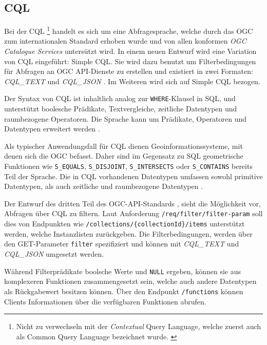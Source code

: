 \subsection{\acl{CQL}}

Bei der \acf{CQL} \footnote{Nicht zu verwechseln mit der \textit{Contextual} Query Language, welche zuerst auch als Common Query Language bezeichnet wurde. \parencite{thelibraryofcongressCQLContextual2023, ZINGGentle2003}} handelt es sich um eine Abfragesprache, welche durch das \ac{OGC} zum internationalen Standard erhoben wurde und von allen konformen \textit{\ac{OGC} Catalogue Services} untersützt wird.  In einem neuen Entwurf  wird eine Variation von \ac{CQL} eingeführt: Simple \ac{CQL}. Sie wird dazu benutzt um Filterbedingungen für Abfragen an \ac{OGC} API-Dienste zu erstellen und existiert in zwei Formaten: \textit{CQL\_TEXT} und \textit{CQL\_JSON} . Im Weiteren wird sich auf Simple \ac{CQL} bezogen.

Der Syntax von \ac{CQL} ist inhaltlich analog zur \texttt{WHERE}-Klausel in \acs{SQL}, und unterstützt boolesche Prädikate, Textvergleiche, zeitliche Datentypen und raumbezogene Operatoren. Die Sprache kann um Prädikate, Operatoren und Datentypen erweitert werden .

Als typischer Anwendungsfall für \ac{CQL} dienen Geoinformationssysteme, mit denen sich die \ac{OGC} befasst. Daher sind im Gegensatz zu \ac{SQL} geometrische Funktionen wie \texttt{S\_EQUALS}, \texttt{S\_DISJOINT}, \texttt{S\_INTERSECTS} oder \texttt{S\_CONTAINS} bereits Teil der Sprache. Die in \ac{CQL} vorhandenen Datentypen umfassen sowohl primitive Datentypen, als auch zeitliche und raumbezogene Datentypen .

Der Entwurf des dritten Teil des OGC-API-Standards , sieht die Möglichkeit vor, Abfragen über \ac{CQL} zu filtern. Laut Anforderung \texttt{/req/filter/filter-param} soll dies von Endpunkten wie \texttt{/collections/\{collectionId\}/items} unterstützt werden, welche Instanzlisten zurückgeben. Die Filterbedingungen, werden über den GET-Parameter \texttt{filter} spezifiziert und können mit \textit{CQL\_TEXT} und \textit{CQL\_JSON} umgesetzt werden.

Während Filterprädikate boolsche Werte und \texttt{NULL} ergeben, können sie aus komplexeren Funktionen zusammengesetzt sein, welche auch andere Datentypen als Rückgabewert besitzen können. Über den Endpunkt \texttt{/functions} können Clients Informationen über die verfügbaren Funktionen abrufen.
